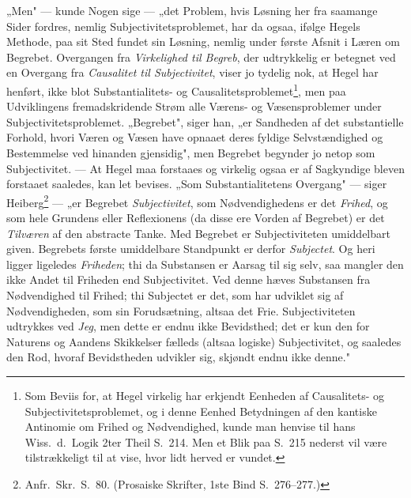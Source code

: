\documentclass[12pt]{book}
\newcommand{\opage}[1]{\marginnote{\footnotesize\textit{[#1]}}}
\begin{document}
„Men" --- kunde Nogen sige --- „det Problem, hvis Løsning her fra saamange Sider fordres,
nemlig Subjectivitetsproblemet, har da ogsaa, ifølge Hegels Methode, paa sit Sted fundet
sin Løsning, nemlig under første Afsnit i Læren om Begrebet. Overgangen fra
\emph{Virkelighed til Begreb}, der udtrykkelig er betegnet ved en Overgang fra
\emph{Causalitet til Subjectivitet}, viser jo tydelig nok, at Hegel har henført, ikke blot
Substantialitets- og Causalitetsproblemet\footnote{Som Beviis for, at Hegel virkelig har
erkjendt Eenheden af Causalitets- og Subjectivitetsproblemet, og i denne Eenhed
Betydningen af den kantiske Antinomie om Frihed og Nødvendighed, kunde man henvise til hans
Wiss.\ d.\ Logik 2ter Theil S.~214. Men et Blik paa S.~215 nederst vil være tilstrækkeligt
til at vise, hvor lidt herved er vundet.}, men paa
\opage{140} %
Udviklingens fremadskridende Strøm alle Værens- og Væsensproblemer under
Subjectivitetsproblemet. „Begrebet", siger han, „er Sandheden af det substantielle
Forhold, hvori Væren og Væsen have opnaaet deres fyldige Selvstændighed og Bestemmelse ved
hinanden gjensidig", men Begrebet begynder jo netop som Subjectivitet. --- At Hegel maa
forstaaes og virkelig ogsaa er af Sagkyndige bleven forstaaet saaledes, kan let bevises.
„Som Substantialitetens Overgang" --- siger Heiberg\footnote{Anfr.\ Skr.\ S.~80.
(Prosaiske Skrifter, 1ste Bind S.~276--277.)} --- „er Begrebet \emph{Subjectivitet}, som
Nødvendighedens er det \emph{Frihed}, og som hele Grundens eller Reflexionens (da disse ere
Vorden af Begrebet) er det \emph{Tilværen} af den abstracte Tanke. Med Begrebet er
Subjectiviteten umiddelbart given. Begrebets første umiddelbare Standpunkt er derfor
\emph{Subjectet}. Og heri ligger ligeledes \emph{Friheden}; thi da Substansen er Aarsag
til sig selv, saa mangler den ikke Andet til Friheden end Subjectivitet. Ved denne hæves
Substansen fra Nødvendighed til Frihed; thi Subjectet er det, som har udviklet sig af
Nødvendigheden, som sin Forudsætning, altsaa det Frie. Subjectiviteten udtrykkes ved
\emph{Jeg}, men dette er endnu ikke Bevidsthed; det er kun den for Naturens og Aandens
Skikkelser fælleds (altsaa logiske) Subjectivitet, og saaledes den Rod, hvoraf
Bevidstheden udvikler sig, skjøndt endnu ikke denne."
\end{document}
